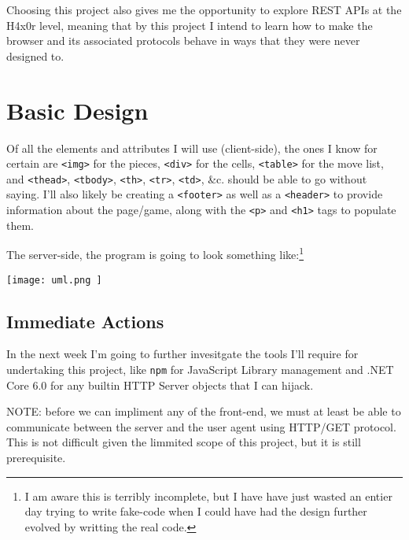 \documentclass[11pt,twoside,letterpaper]{article}
\begin{document}
Choosing this project also gives me the opportunity to explore REST APIs at the H4x0r level, meaning that by this project I intend to learn how to make the browser and its associated protocols behave in ways that they were never designed to.

\section{ Basic Design }
Of all the elements and attributes I will use (client-side), the ones I know for certain are \texttt{<img>} for the pieces, \texttt{<div>} for the cells, \texttt{<table>} for the move list, and \texttt{<thead>}, \texttt{<tbody>}, \texttt{<th>}, \texttt{<tr>}, \texttt{<td>}, \&c. should be able to go without saying.
I'll also likely be creating a \texttt{<footer>} as well as a \texttt{<header>} to provide information about the page/game, along with the \texttt{<p>} and \texttt{<h1>} tags to populate them.

The server-side, the program is going to look something like:\footnote{ I am aware this is terribly incomplete, but I have have just wasted an entier day trying to write fake-code when I could have had the design further evolved by writting the real code. }

\texttt{[image:  uml.png ]}

\subsection{ Immediate Actions }
In the next week I'm going to further invesitgate the tools I'll require for undertaking this project, like \texttt{npm} for JavaScript Library management and .NET Core 6.0 for any builtin HTTP Server objects that I can hijack.

NOTE: before we can impliment any of the front-end, we must at least be able to communicate between the server and the user agent using HTTP/GET protocol.  This is not difficult given the limmited scope of this project, but it is still prerequisite.
\end{document}
